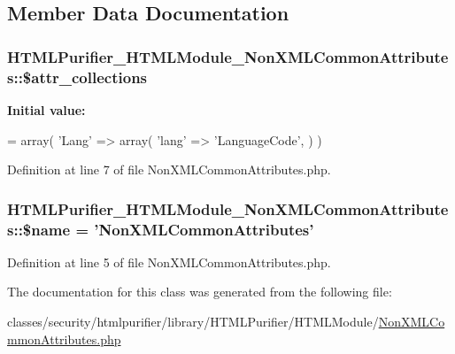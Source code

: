 \subsection{Member Data Documentation}
\hypertarget{classHTMLPurifier__HTMLModule__NonXMLCommonAttributes_a1b6278c5b511e70b75d317bac85dbb22}{
\subsubsection[{\$attr\+\_\+collections}]{\setlength{\rightskip}{0pt plus 5cm}H\+T\+M\+L\+Purifier\+\_\+\+H\+T\+M\+L\+Module\+\_\+\+Non\+X\+M\+L\+Common\+Attributes\+::\$attr\+\_\+collections}}\label{classHTMLPurifier__HTMLModule__NonXMLCommonAttributes_a1b6278c5b511e70b75d317bac85dbb22}
{\bfseries Initial value\+:}
\begin{DoxyCode}
= array(
        \textcolor{stringliteral}{'Lang'} => array(
            \textcolor{stringliteral}{'lang'} => \textcolor{stringliteral}{'LanguageCode'},
        )
    )
\end{DoxyCode}


Definition at line 7 of file Non\+X\+M\+L\+Common\+Attributes.\+php.

\hypertarget{classHTMLPurifier__HTMLModule__NonXMLCommonAttributes_abad2282b74aaa25f94d0c3f7fb0c61a7}{
\subsubsection[{\$name}]{\setlength{\rightskip}{0pt plus 5cm}H\+T\+M\+L\+Purifier\+\_\+\+H\+T\+M\+L\+Module\+\_\+\+Non\+X\+M\+L\+Common\+Attributes\+::\$name = 'Non\+X\+M\+L\+Common\+Attributes'}}\label{classHTMLPurifier__HTMLModule__NonXMLCommonAttributes_abad2282b74aaa25f94d0c3f7fb0c61a7}


Definition at line 5 of file Non\+X\+M\+L\+Common\+Attributes.\+php.



The documentation for this class was generated from the following file\+:\begin{DoxyCompactItemize}
\item 
classes/security/htmlpurifier/library/\+H\+T\+M\+L\+Purifier/\+H\+T\+M\+L\+Module/\hyperlink{NonXMLCommonAttributes_8php}{Non\+X\+M\+L\+Common\+Attributes.\+php}\end{DoxyCompactItemize}

